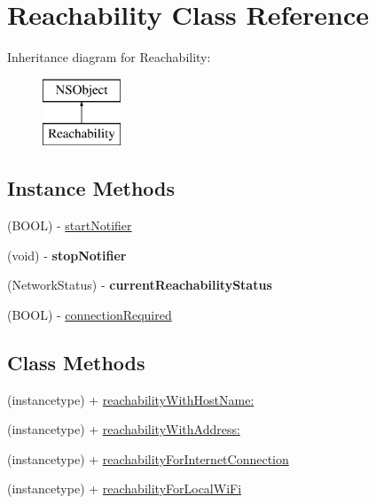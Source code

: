 \hypertarget{interface_reachability}{\section{Reachability Class Reference}
\label{interface_reachability}
}
Inheritance diagram for Reachability\-:\begin{figure}[H]
\begin{center}
\leavevmode
\includegraphics[height=2.000000cm]{interface_reachability}
\end{center}
\end{figure}
\subsection*{Instance Methods}
\begin{DoxyCompactItemize}
\item 
(B\-O\-O\-L) -\/ \hyperlink{interface_reachability_ab41a66b8c9a31c7164d7f67aa6026dfe}{start\-Notifier}
\item 
\hypertarget{interface_reachability_a78eccfa191bccad1d2f031906187aa63}{(void) -\/ {\bfseries stop\-Notifier}}\label{interface_reachability_a78eccfa191bccad1d2f031906187aa63}

\item 
\hypertarget{interface_reachability_a2ad5c5d8658d989648117c3b4b87b7d7}{(Network\-Status) -\/ {\bfseries current\-Reachability\-Status}}\label{interface_reachability_a2ad5c5d8658d989648117c3b4b87b7d7}

\item 
(B\-O\-O\-L) -\/ \hyperlink{interface_reachability_acbfea5cbb2bd94433fff2d814ac93028}{connection\-Required}
\end{DoxyCompactItemize}
\subsection*{Class Methods}
\begin{DoxyCompactItemize}
\item 
(instancetype) + \hyperlink{interface_reachability_a15adbd9589e5801d083aa9ef00ef3c80}{reachability\-With\-Host\-Name\-:}
\item 
(instancetype) + \hyperlink{interface_reachability_a773327c58a639c8c4ab9fec9ddcc0cd3}{reachability\-With\-Address\-:}
\item 
(instancetype) + \hyperlink{interface_reachability_a5854a2f4b1d1971459cace9ca9619b09}{reachability\-For\-Internet\-Connection}
\item 
(instancetype) + \hyperlink{interface_reachability_aead23497f0e9d4df9000549b3c258c1d}{reachability\-For\-Local\-Wi\-Fi}
\end{DoxyCompactItemize}


